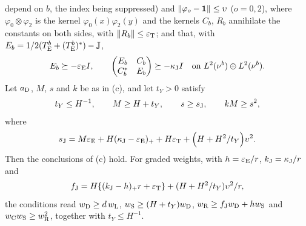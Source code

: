 \begin{lemma}
\begin{enumerate}[label=\textup{(\alph*)}]
 depend on $b$, the index being suppressed) and
 $\|\varphi_o-\mathbf 1\|\le\upsilon$ ($o=0,2$),
 where $\varphi_0\otimes\varphi_2$ is the kernel $\varphi_0(x)\varphi_2(y)$ and the
 kernels $C_b$, $R_b$ annihilate the constants on both sides, with
 $\|R_b\|\le\varepsilon_{\rm T}$; and that, with
 $E_b=1/2(T_{\rm E}^b+(T_{\rm E}^b)^*)-\mathbb J$,
 \[
  E_b\succeq-\varepsilon_{\rm E}I,\qquad
  \begin{pmatrix}E_b&C_b\\ C_b^*&E_b\end{pmatrix}\succeq-\kappa_{\rm J}I
  \quad\text{on }L^2(\nu^b)\oplus L^2(\nu^b).
 \]
 Let $a_{\rm D}$, $M$, $s$ and $k$ be as in (c), and let $t_Y>0$ satisfy
 \[
  t_Y\le H^{-1},\qquad M\ge H+t_Y,\qquad
  s\ge s_{\rm J},\qquad kM\ge s^2,
 \]
 where
 \[
  s_{\rm J}=M\varepsilon_{\rm E}+H(\kappa_{\rm J}-\varepsilon_{\rm E})_++H\varepsilon_{\rm T}
  +\Bigl(H+H^2/t_Y\Bigr)\upsilon^2 .
 \]
 Then the conclusions of (c) hold. For graded weights, with
 $h=\varepsilon_{\rm E}/r$, $k_{\rm J}=\kappa_{\rm J}/r$ and
 \[
  f_{\rm J}=H\{(k_{\rm J}-h)_+r+\varepsilon_{\rm T}\}+(H+H^2/t_Y)\upsilon^2/r,
 \]
 the conditions read $w_{\rm D}\ge d\,w_{\rm L}$,
 $w_{\rm S}\ge(H+t_Y)w_{\rm D}$, $w_{\rm R}\ge f_{\rm J}w_{\rm D}+hw_{\rm S}$ and
 $w_{\rm C}w_{\rm S}\ge w_{\rm R}^2$, together with $t_Y\le H^{-1}$.
\end{enumerate}
\end{lemma}

